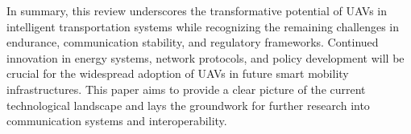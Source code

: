 In summary, this review underscores the transformative potential of UAVs in intelligent transportation systems while recognizing the remaining challenges in endurance, communication stability, and regulatory frameworks. Continued innovation in energy systems, network protocols, and policy development will be crucial for the widespread adoption of UAVs in future smart mobility infrastructures. This paper aims to provide a clear picture of the current technological landscape and lays the groundwork for further research into communication systems and interoperability.
